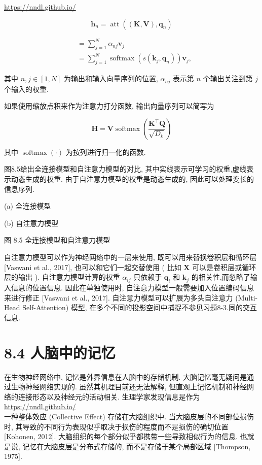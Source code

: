 \documentclass[10pt]{article}
\begin{document}
\href{https://nndl.github.io/}{https://nndl.github.io/}


\begin{equation*}
\boldsymbol{h}_{n}=\operatorname{att}\left((\boldsymbol{K}, \boldsymbol{V}), \boldsymbol{q}_{n}\right) \tag{8.19}
\end{equation*}



\begin{align*}
& =\sum_{j=1}^{N} \alpha_{n j} \boldsymbol{v}_{j}  \tag{8.20}\\
& =\sum_{j=1}^{N} \operatorname{softmax}\left(s\left(\boldsymbol{k}_{j}, \boldsymbol{q}_{n}\right)\right) \boldsymbol{v}_{j}, \tag{8.21}
\end{align*}


其中 $n, j \in[1, N]$ 为输出和输入向量序列的位置, $\alpha_{n j}$ 表示第 $n$ 个输出关注到第 $j$个输入的权重.

如果使用缩放点积来作为注意力打分函数, 输出向量序列可以简写为


\begin{equation*}
\boldsymbol{H}=\boldsymbol{V} \operatorname{softmax}\left(\frac{\boldsymbol{K}^{\top} \boldsymbol{Q}}{\sqrt{D_{k}}}\right) \tag{8.22}
\end{equation*}


其中 $\operatorname{softmax}(\cdot)$ 为按列进行归一化的函数.

图8.5给出全连接模型和自注意力模型的对比, 其中实线表示可学习的权重,虚线表示动态生成的权重. 由于自注意力模型的权重是动态生成的, 因此可以处理变长的信息序列.



(a) 全连接模型



(b) 自注意力模型

图 8.5 全连接模型和自注意力模型

自注意力模型可以作为神经网络中的一层来使用, 既可以用来替换卷积层和循环层 [Vaswani et al., 2017], 也可以和它们一起交替使用 ( 比如 $\boldsymbol{X}$ 可以是卷积层或循环层的输出 ). 自注意力模型计算的权重 $\alpha_{i j}$ 只依赖于 $\boldsymbol{q}_{i}$ 和 $\boldsymbol{k}_{j}$ 的相关性,而忽略了输入信息的位置信息. 因此在单独使用时, 自注意力模型一般需要加入位置编码信息来进行修正 [Vaswani et al., 2017]. 自注意力模型可以扩展为多头自注意力 (Multi-Head Self-Attention) 模型, 在多个不同的投影空间中捕捉不参见习题8-3.同的交互信息.

\section*{8.4 人脑中的记忆}
在生物神经网络中, 记忆是外界信息在人脑中的存储机制. 大脑记忆毫无疑问是通过生物神经网络实现的. 虽然其机理目前还无法解释, 但直观上记忆机制和神经网络的连接形态以及神经元的活动相关. 生理学家发现信息是作为 \href{https://nndl.github.io/}{https://nndl.github.io/}\\
一种整体效应 (Collective Effect) 存储在大脑组织中. 当大脑皮层的不同部位损伤时, 其导致的不同行为表现似乎取决于损伤的程度而不是损伤的确切位置 [Kohonen, 2012]. 大脑组织的每个部分似乎都携带一些导致相似行为的信息. 也就是说, 记忆在大脑皮层是分布式存储的, 而不是存储于某个局部区域 [Thompson, 1975].
\end{document}

